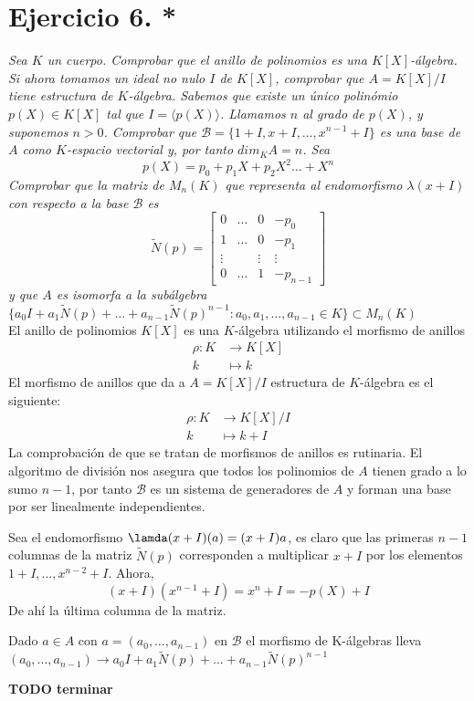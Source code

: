 \section{Ejercicio 6. *} \emph{Sea \(K\) un cuerpo. Comprobar que el anillo de polinomios
es una \(K[X]\)-álgebra. Si ahora tomamos un ideal no nulo \(I\) de
\(K[X]\), comprobar que \(A = K[X]/I\) tiene estructura de
\(K\)-álgebra. Sabemos que existe un único polinómio \(p(X) \in K[X]\) tal que
\(I = \langle p(X) \rangle\). Llamamos \(n\) al grado de \(p(X)\), y suponemos
\(n > 0\). Comprobar que \(\mathcal{B} = \{1 + I, x + I, \dots, x^{n-1} + I\}\)
es una base de \(A\) como \(K\)-espacio vectorial y, por tanto \(dim_KA = n\).
Sea}
\[
p(X) = p_0 + p_1X + p_2X^2\dots + X^n
\]
\emph{Comprobar que la matriz de \(M_n(K)\) que representa al endomorfismo \(\lambda(x
+ I)\) con respecto a la base \(\mathcal{B}\) es}
\[
\tilde{N}(p) = \begin{bmatrix}
    0       &  \dots  & 0 & -p_0 \\
    1       &  \dots  & 0 & -p_1 \\
    \vdots &  & \vdots & \vdots \\
    0       &  \dots  & 1 & -p_{n-1}
\end{bmatrix}
\]
\emph{y que \(A\) es isomorfa a la subálgebra \(\{a_0I + a_1\tilde{N}(p) + \dots +
  a_{n-1}\tilde{N}(p)^{n-1} : a_0, a_1, \dots, a_{n-1} \in K\} \subset M_n(K)\)}\\

El anillo de polinomios \(K[X]\) es una \(K\)-álgebra utilizando el morfismo de
anillos
\[
\begin{aligned}
  \rho: K &\to K[X]\\
        k &\mapsto k
\end{aligned}
\]
El morfismo de anillos que da a \(A = K[X]/I\) estructura de \(K\)-álgebra es el
siguiente:
\[
\begin{aligned}
  \rho: K &\to K[X]/I \\
  k &\mapsto k + I
\end{aligned}
\]
La comprobación de que se tratan de morfismos de anillos es rutinaria.
El algoritmo de división nos asegura que todos los polinomios de \(A\) tienen
grado a lo sumo \(n-1\), por tanto \(\mathcal{B}\) es un sistema de generadores
de \(A\) y forman una base por ser linealmente independientes.

Sea el endomorfismo \(\lamda(x+I)(a) = (x+I)a\), es claro que las primeras
\(n-1\) columnas de la matriz \(\tilde{N}(p)\) corresponden a multiplicar \(x +
I\) por los elementos \(1 + I, \dots, x^{n-2} + I\). Ahora,
\[
(x + I)(x^{n-1} + I) = x^n + I = -p(X) + I
\]
De ahí la última columna de la matriz.

Dado \(a \in A\) con \(a = (a_0, \dots, a_{n-1})\) en \(\mathcal{B}\) el
morfismo de K-álgebras lleva \((a_0,\dots,a_{n-1}) \to a_0I + a_1\tilde{N}(p) + \dots +
  a_{n-1}\tilde{N}(p)^{n-1} \)

\textbf{TODO terminar}
